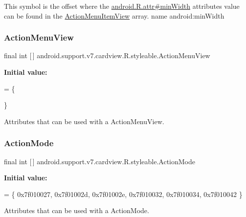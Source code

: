 This symbol is the offset where the \hyperlink{}{android.\+R.\+attr\#min\+Width} attribute\textquotesingle{}s value can be found in the \hyperlink{classandroid_1_1support_1_1v7_1_1cardview_1_1R_1_1styleable_a0a5244adfad6844917f4187bd66c7319}{Action\+Menu\+Item\+View} array.  name android\+:min\+Width \mbox{\label{classandroid_1_1support_1_1v7_1_1cardview_1_1R_1_1styleable_a5aa20c8117c982585cb9910dccc7eddf}} 
\subsubsection{\texorpdfstring{Action\+Menu\+View}{ActionMenuView}}
{\footnotesize\ttfamily final int \mbox{[}$\,$\mbox{]} android.\+support.\+v7.\+cardview.\+R.\+styleable.\+Action\+Menu\+View\hspace{0.3cm}{\ttfamily [static]}}

{\bfseries Initial value\+:}
\begin{DoxyCode}
= \{
            
        \}
\end{DoxyCode}
Attributes that can be used with a Action\+Menu\+View. \mbox{\label{classandroid_1_1support_1_1v7_1_1cardview_1_1R_1_1styleable_aadab2db6f0b961c9bad3b28abb49a9b0}} 
\subsubsection{\texorpdfstring{Action\+Mode}{ActionMode}}
{\footnotesize\ttfamily final int \mbox{[}$\,$\mbox{]} android.\+support.\+v7.\+cardview.\+R.\+styleable.\+Action\+Mode\hspace{0.3cm}{\ttfamily [static]}}

{\bfseries Initial value\+:}
\begin{DoxyCode}
= \{
            0x7f010027, 0x7f01002d, 0x7f01002e, 0x7f010032,
            0x7f010034, 0x7f010042
        \}
\end{DoxyCode}
Attributes that can be used with a Action\+Mode. 

